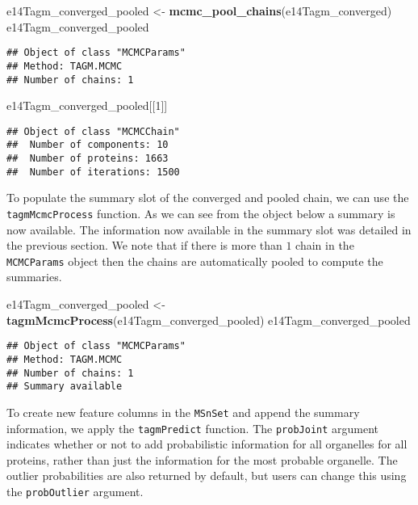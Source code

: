 \documentclass[9pt,a4paper,]{extarticle}
\newenvironment{Shaded}{\begin{snugshade}}{\end{snugshade}}
\newcommand{\DecValTok}[1]{\textcolor[rgb]{0.00,0.00,0.81}{#1}}
\newcommand{\KeywordTok}[1]{\textcolor[rgb]{0.13,0.29,0.53}{\textbf{#1}}}
\newcommand{\NormalTok}[1]{#1}
\newcommand{\StringTok}[1]{\textcolor[rgb]{0.31,0.60,0.02}{#1}}
\begin{document}
\begin{Shaded}
\begin{Highlighting}[]
\NormalTok{e14Tagm_converged_pooled <-}\StringTok{ }\KeywordTok{mcmc_pool_chains}\NormalTok{(e14Tagm_converged)}
\NormalTok{e14Tagm_converged_pooled}
\end{Highlighting}
\end{Shaded}

\begin{verbatim}
## Object of class "MCMCParams"
## Method: TAGM.MCMC 
## Number of chains: 1
\end{verbatim}

\begin{Shaded}
\begin{Highlighting}[]
\NormalTok{e14Tagm_converged_pooled[[}\DecValTok{1}\NormalTok{]]}
\end{Highlighting}
\end{Shaded}

\begin{verbatim}
## Object of class "MCMCChain"
##  Number of components: 10 
##  Number of proteins: 1663 
##  Number of iterations: 1500
\end{verbatim}

To populate the summary slot of the converged and pooled chain, we can use
the \texttt{tagmMcmcProcess} function. As we can see from the object below a summary
is now available. The information now available in the summary slot was detailed
in the previous section. We note that if there is more than \(1\) chain
in the \texttt{MCMCParams} object then the chains are automatically pooled
to compute the summaries.

\begin{Shaded}
\begin{Highlighting}[]
\NormalTok{e14Tagm_converged_pooled <-}\StringTok{ }\KeywordTok{tagmMcmcProcess}\NormalTok{(e14Tagm_converged_pooled)}
\NormalTok{e14Tagm_converged_pooled}
\end{Highlighting}
\end{Shaded}

\begin{verbatim}
## Object of class "MCMCParams"
## Method: TAGM.MCMC 
## Number of chains: 1 
## Summary available
\end{verbatim}

To create new feature columns in the \texttt{MSnSet} and append the summary
information, we apply the \texttt{tagmPredict} function. The \texttt{probJoint}
argument indicates whether or not to add probabilistic information for
all organelles for all proteins, rather than just the information for
the most probable organelle. The outlier probabilities are also returned
by default, but users can change this using the \texttt{probOutlier}
argument.
\end{document}
